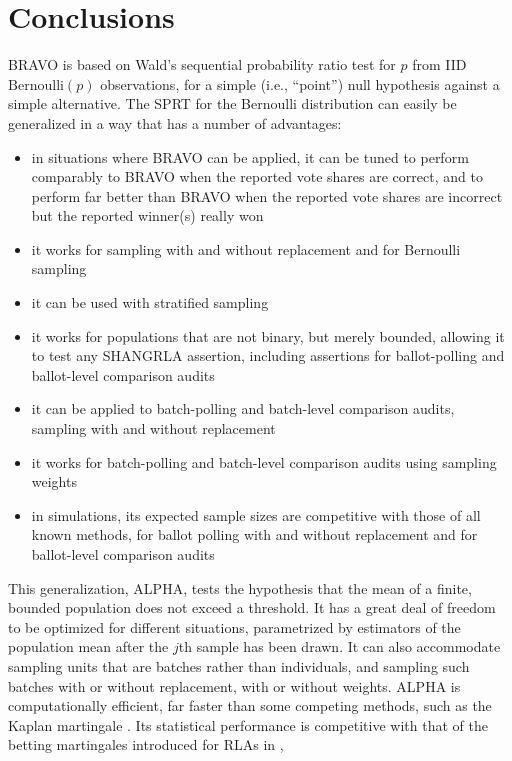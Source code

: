 \documentclass[aoas]{imsart}
\newcommand{\Bern}{\ensuremath{\mathrm{Bernoulli}}}
\begin{document}
\section{Conclusions}
BRAVO is based on Wald's sequential probability ratio test for $p$ from IID $\Bern(p)$ observations, for a simple (i.e., ``point'') null hypothesis against a simple alternative.
The SPRT for the Bernoulli distribution can easily be generalized in a way that has a number of advantages:
\begin{itemize}
   \item in situations where BRAVO can be applied, it can be tuned to perform comparably to BRAVO when the reported vote shares are correct, 
             and to perform far better than BRAVO when the reported vote shares are incorrect but the reported winner(s) really won
   \item it works for sampling with and without replacement and for Bernoulli sampling
   \item it can be used with stratified sampling 
   \item it works for populations that are not binary, but merely bounded, allowing it to test any SHANGRLA assertion,
            including assertions for ballot-polling and ballot-level comparison audits
   \item it can be applied to batch-polling and batch-level comparison audits, sampling with and without replacement
   \item it works for batch-polling and batch-level comparison audits using sampling weights
   \item in simulations, its expected sample sizes are competitive with those of all known methods, for ballot polling with and without replacement and 
            for ballot-level comparison audits
   \end{itemize}
This generalization, ALPHA, tests the hypothesis that the mean of a finite, bounded population does not exceed a threshold.
It has a great deal of freedom to be optimized for different situations, parametrized by
estimators of the population mean after the $j$th sample has been drawn.
It can also accommodate sampling units that are batches rather than individuals, and sampling such batches
with or without replacement, with or without weights.
ALPHA is computationally efficient, far faster than some competing methods, such as the Kaplan martingale \citep{starkEvans19,stark20}.
Its statistical performance is competitive with that of the betting martingales introduced for RLAs in \citet{waudby-smithEtal21},
\end{document}
